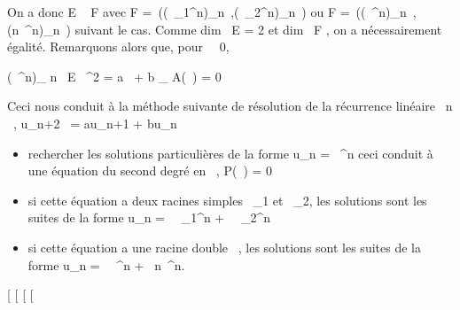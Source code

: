 \documentclass[]{article}
\begin{document}
On a donc E \subset~ F avec F =\
\mathrmVect((\lambda~\_1^n)\_n\in{}~,(\lambda~\_2^n)\_n\in{}~)
ou F =\
\mathrmVect((\lambda~^n)\_n\in\mathbb{N}~,(n\lambda~^n)\_n\in\mathbb{N}~)
suivant le cas. Comme dim~ E = 2 et
dim~ F \leq 2, on a nécessairement égalité.
Remarquons alors que, pour \lambda~\neq~0,

(\lambda~^n)\_ n\in{}~ \in E\quad
\Leftrightarrow \lambda~^2 = a\lambda~ + b
\Leftrightarrow \chi\_ A(\lambda~) = 0

Ceci nous conduit à la méthode suivante de résolution de la récurrence
linéaire \forall~n \in {}~, u\_n+2~ =
au\_n+1 + bu\_n

\begin{itemize}
\itemsep1pt\parskip0pt
\item
  rechercher les solutions particulières de la forme u\_n =
  \lambda~^n ceci conduit à une équation du second degré en \lambda~, P(\lambda~)
  = 0
\item
  si cette équation a deux racines simples \lambda~\_1 et \lambda~\_2,
  les solutions sont les suites de la forme u\_n =
  \alpha~\lambda~\_1^n + \beta~\lambda~\_2^n
\item
  si cette équation a une racine double \lambda~, les solutions sont les suites
  de la forme u\_n = \alpha~\lambda~^n + \beta~n\lambda~^n.
\end{itemize}

{[}
{[}
{[}
{[}
\end{document}
